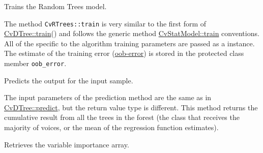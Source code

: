 
Trains the Random Trees model.


The method \texttt{CvRTrees::train} is very similar to the first form of \href{#CvDTree.3A.3Atrain}{CvDTree::train}() and follows the generic method \href{#CvStatModel.3A.3Atrain}{CvStatModel::train} conventions. All of the specific to the algorithm training parameters are passed as a  instance. The estimate of the training error (\href{#RTreesOOBerror}{oob-error}) is stored in the protected class member \texttt{oob\_error}.



Predicts the output for the input sample.


The input parameters of the prediction method are the same as in \href{#CvDTree.3A.3Apredict}{CvDTree::predict}, but the return value type is different. This method returns the cumulative result from all the trees in the forest (the class that receives the majority of voices, or the mean of the regression function estimates).



Retrieves the variable importance array.


